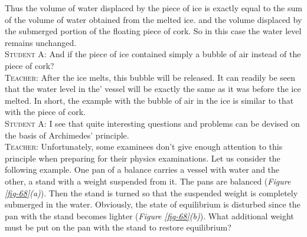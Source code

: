 \documentclass[a4paper,sfsidenotes]{tufte-book}
\begin{document}
Thus the volume of water displaced by the piece of ice is exactly equal to the sum of the volume of water obtained from the melted ice. and the volume displaced by the submerged portion of the floating piece of cork. So in this case the water level remains unchanged.
\\
\textsc{Student A:} And if the piece of ice contained simply a bubble of air instead of the piece of cork?
\\
\textsc{Teacher:} After the ice melts, this bubble will be released. It can readily be seen that the water level in the' vessel will be exactly the same as it was before the ice melted. In short, the example with the bubble of air in the ice is similar to that with the piece of cork.
\\
\textsc{Student A:} I see that quite interesting questions and problems can be devised on the basis of Archimedes' principle.
\\
\textsc{Teacher:} Unfortunately, some examinees don't give enough attention to this principle when preparing for their physics examinations. Let us consider the following example. One pan of a balance
carries a vessel with water and the other, a stand with a weight suspended from it. The pans are balanced (\emph{Figure \ref{fig-68}(a)}). Then the stand is turned so that the suspended weight is completely submerged in the water. Obviously, the state of equilibrium is disturbed since the pan with the stand becomes lighter (\emph{Figure \ref{fig-68}(b)}). What additional weight must be put on the pan with the stand to restore equilibrium?
\end{document}
